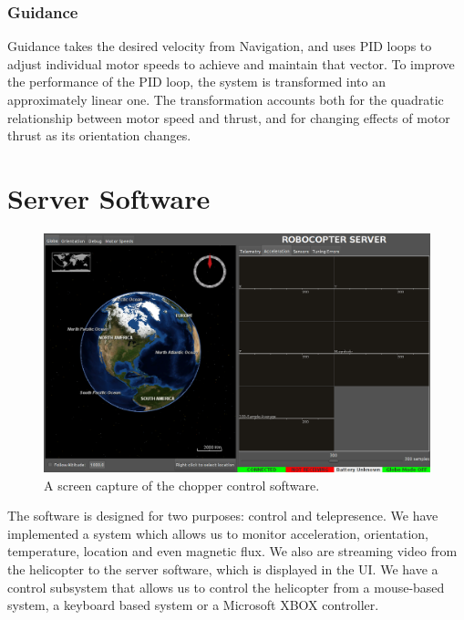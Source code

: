 \subsubsection{Guidance}
Guidance takes the desired velocity from Navigation,‭ ‬and uses PID
loops to adjust individual motor speeds to achieve and maintain that
vector.‭  ‬To improve the performance of the PID loop,‭ ‬the system is
transformed into an approximately linear one.‭  ‬The transformation
accounts both for the quadratic relationship between motor speed and
thrust,‭ ‬and for changing effects of motor thrust as its orientation
changes.

\section{Server Software}
\begin{figure}[h]
  \centering
  \includegraphics[scale=0.3]{figures/globe-screenshot}
  \caption{A screen capture of the chopper control software.}
  \label{fig:globe}
\end{figure}

The software is designed for two purposes: control and
telepresence. We have implemented a system which allows us to monitor
acceleration, orientation, temperature, location and even magnetic
flux. We also are streaming video from the helicopter to the server
software, which is displayed in the UI. We have a control subsystem
that allows us to control the helicopter from a mouse-based system, a
keyboard based system or a Microsoft XBOX controller. 

